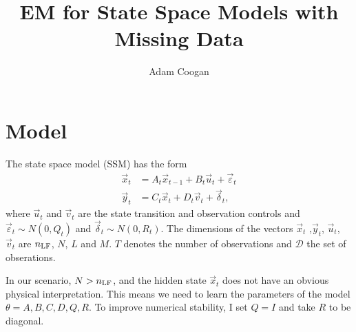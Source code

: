 \documentclass[10pt]{article}
\newcommand\nlf{n_{\rm LF}}
\begin{document}
 
\title{EM for State Space Models with Missing Data}
\author{Adam Coogan}
\maketitle

\section{Model}

The state space model (SSM) has the form
\begin{align}
    \vec{x}_t &= A_t \vec{x}_{t-1} + B_t \vec{u}_t + \vec{\varepsilon}_t\\
    \vec{y}_t &= C_t \vec{x}_t + D_t \vec{v}_t + \vec{\delta}_t,
\end{align}
where $\vec{u}_t$ and $\vec{v}_t$ are the state transition and observation controls and $\vec{\varepsilon}_t \sim N(0, Q_t)$ and $\vec{\delta}_t \sim N(0, R_t)$. The dimensions of the vectors $\vec{x}_t$ ,$\vec{y}_t$, $\vec{u}_t$, $\vec{v}_t$ are $\nlf$, $N$, $L$ and $M$. $T$ denotes the number of observations and $\mathcal{D}$ the set of obserations.

In our scenario, $N > \nlf$, and the hidden state $\vec{x}_t$ does not have an obvious physical interpretation. This means we need to learn the parameters of the model $\theta = {A, B, C, D, Q, R}$. To improve numerical stability, I set $Q = I$ and take $R$ to be diagonal.
\end{document}
